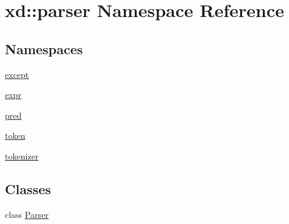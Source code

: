 \hypertarget{namespacexd_1_1parser}{}\section{xd\+:\+:parser Namespace Reference}
\label{namespacexd_1_1parser}
\subsection*{Namespaces}
\begin{DoxyCompactItemize}
\item 
 \mbox{\hyperlink{namespacexd_1_1parser_1_1except}{except}}
\item 
 \mbox{\hyperlink{namespacexd_1_1parser_1_1expr}{expr}}
\item 
 \mbox{\hyperlink{namespacexd_1_1parser_1_1pred}{pred}}
\item 
 \mbox{\hyperlink{namespacexd_1_1parser_1_1token}{token}}
\item 
 \mbox{\hyperlink{namespacexd_1_1parser_1_1tokenizer}{tokenizer}}
\end{DoxyCompactItemize}
\subsection*{Classes}
\begin{DoxyCompactItemize}
\item 
class \mbox{\hyperlink{classxd_1_1parser_1_1_parser}{Parser}}
\end{DoxyCompactItemize}
